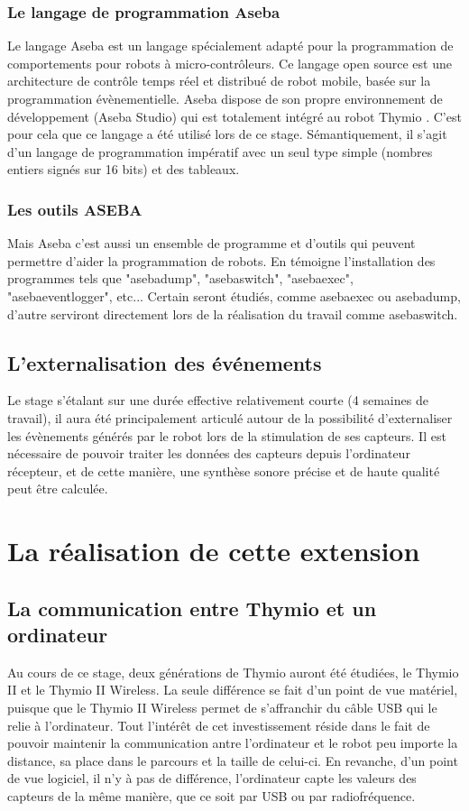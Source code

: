 \documentclass[a4paper, 12pt]{report}
\begin{document}
\subsection{Le langage de programmation Aseba \pageref{aseba} }
\label{aseba}
Le langage Aseba \cite{ManualASEBA} est un langage spécialement adapté pour la programmation de comportements pour robots à micro-contrôleurs. Ce langage open source est une architecture de contrôle temps réel et distribué de robot mobile, basée sur la programmation évènementielle. Aseba dispose de son propre environnement de développement (Aseba Studio) qui est totalement intégré au robot Thymio \pageref{thymio}. C'est pour cela que ce langage a été utilisé lors de ce stage. Sémantiquement, il s'agit d'un langage de programmation impératif avec un seul type simple (nombres entiers signés sur 16 bits) et des tableaux.

\subsection{Les outils ASEBA}
Mais Aseba \pageref{aseba} c'est aussi un ensemble de programme et d'outils qui peuvent permettre d'aider la programmation de robots. En témoigne l'installation des programmes tels que "asebadump", "asebaswitch", "asebaexec", "asebaeventlogger", etc...
Certain seront étudiés, comme asebaexec ou asebadump, d'autre serviront directement lors de la réalisation du travail comme asebaswitch.

\section{L'externalisation des événements}
Le stage s'étalant sur une durée effective relativement courte (4 semaines de travail), il aura été principalement articulé autour de la possibilité d'externaliser les évènements générés par le robot lors de la stimulation de ses capteurs. Il est nécessaire de pouvoir traiter les données des capteurs depuis l'ordinateur récepteur, et de cette manière, une synthèse sonore précise et de haute qualité peut être calculée.

\chapter{La réalisation de cette extension}
\section{La communication entre Thymio et un ordinateur}
Au cours de ce stage, deux générations de Thymio \pageref{thymio} auront été étudiées, le Thymio II et le Thymio II Wireless. La seule différence se fait d'un point de vue matériel, puisque que le Thymio II Wireless permet de s'affranchir du câble USB qui le relie à l'ordinateur. Tout l'intérêt de cet investissement réside dans le fait de pouvoir maintenir la communication antre l'ordinateur et le robot peu importe la distance, sa place dans le parcours et la taille de celui-ci. En revanche, d'un point de vue logiciel, il n'y à pas de différence, l'ordinateur capte les valeurs des capteurs de la même manière, que ce soit par USB ou par radiofréquence.
\end{document}
